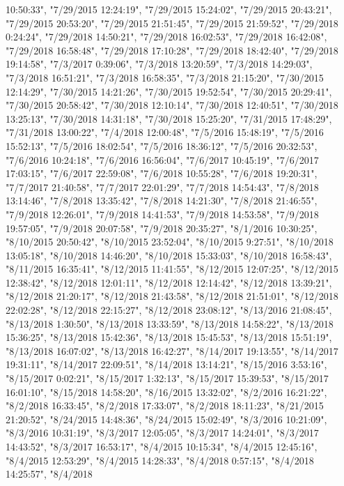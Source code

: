 \documentclass[]{article}
\begin{document}
\begin{itemize}
  10:50:33", "7/29/2015 12:24:19", "7/29/2015 15:24:02", "7/29/2015
  20:43:21", "7/29/2015 20:53:20", "7/29/2015 21:51:45", "7/29/2015
  21:59:52", "7/29/2018 0:24:24", "7/29/2018 14:50:21", "7/29/2018
  16:02:53", "7/29/2018 16:42:08", "7/29/2018 16:58:48", "7/29/2018
  17:10:28", "7/29/2018 18:42:40", "7/29/2018 19:14:58", "7/3/2017
  0:39:06", "7/3/2018 13:20:59", "7/3/2018 14:29:03", "7/3/2018
  16:51:21", "7/3/2018 16:58:35", "7/3/2018 21:15:20", "7/30/2015
  12:14:29", "7/30/2015 14:21:26", "7/30/2015 19:52:54", "7/30/2015
  20:29:41", "7/30/2015 20:58:42", "7/30/2018 12:10:14", "7/30/2018
  12:40:51", "7/30/2018 13:25:13", "7/30/2018 14:31:18", "7/30/2018
  15:25:20", "7/31/2015 17:48:29", "7/31/2018 13:00:22", "7/4/2018
  12:00:48", "7/5/2016 15:48:19", "7/5/2016 15:52:13", "7/5/2016
  18:02:54", "7/5/2016 18:36:12", "7/5/2016 20:32:53", "7/6/2016
  10:24:18", "7/6/2016 16:56:04", "7/6/2017 10:45:19", "7/6/2017
  17:03:15", "7/6/2017 22:59:08", "7/6/2018 10:55:28", "7/6/2018
  19:20:31", "7/7/2017 21:40:58", "7/7/2017 22:01:29", "7/7/2018
  14:54:43", "7/8/2018 13:14:46", "7/8/2018 13:35:42", "7/8/2018
  14:21:30", "7/8/2018 21:46:55", "7/9/2018 12:26:01", "7/9/2018
  14:41:53", "7/9/2018 14:53:58", "7/9/2018 19:57:05", "7/9/2018
  20:07:58", "7/9/2018 20:35:27", "8/1/2016 10:30:25", "8/10/2015
  20:50:42", "8/10/2015 23:52:04", "8/10/2015 9:27:51", "8/10/2018
  13:05:18", "8/10/2018 14:46:20", "8/10/2018 15:33:03", "8/10/2018
  16:58:43", "8/11/2015 16:35:41", "8/12/2015 11:41:55", "8/12/2015
  12:07:25", "8/12/2015 12:38:42", "8/12/2018 12:01:11", "8/12/2018
  12:14:42", "8/12/2018 13:39:21", "8/12/2018 21:20:17", "8/12/2018
  21:43:58", "8/12/2018 21:51:01", "8/12/2018 22:02:28", "8/12/2018
  22:15:27", "8/12/2018 23:08:12", "8/13/2016 21:08:45", "8/13/2018
  1:30:50", "8/13/2018 13:33:59", "8/13/2018 14:58:22", "8/13/2018
  15:36:25", "8/13/2018 15:42:36", "8/13/2018 15:45:53", "8/13/2018
  15:51:19", "8/13/2018 16:07:02", "8/13/2018 16:42:27", "8/14/2017
  19:13:55", "8/14/2017 19:31:11", "8/14/2017 22:09:51", "8/14/2018
  13:14:21", "8/15/2016 3:53:16", "8/15/2017 0:02:21", "8/15/2017
  1:32:13", "8/15/2017 15:39:53", "8/15/2017 16:01:10", "8/15/2018
  14:58:20", "8/16/2015 13:32:02", "8/2/2016 16:21:22", "8/2/2018
  16:33:45", "8/2/2018 17:33:07", "8/2/2018 18:11:23", "8/21/2015
  21:20:52", "8/24/2015 14:48:36", "8/24/2015 15:02:49", "8/3/2016
  10:21:09", "8/3/2016 10:31:19", "8/3/2017 12:05:05", "8/3/2017
  14:24:01", "8/3/2017 14:43:52", "8/3/2017 16:53:17", "8/4/2015
  10:15:34", "8/4/2015 12:45:16", "8/4/2015 12:53:29", "8/4/2015
  14:28:33", "8/4/2018 0:57:15", "8/4/2018 14:25:57", "8/4/2018

\end{itemize}
\end{document}
